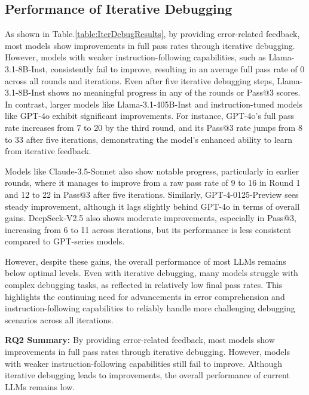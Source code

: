 \subsection{Performance of Iterative Debugging}  

As shown in Table.\ref{table:IterDebugResults}, by providing error-related feedback, most models show improvements in full pass rates through iterative debugging. However, models with weaker instruction-following capabilities, such as Llama-3.1-8B-Inst, consistently fail to improve, resulting in an average full pass rate of 0 across all rounds and iterations. Even after five iterative debugging steps, Llama-3.1-8B-Inst shows no meaningful progress in any of the rounds or Pass@3 scores. In contrast, larger models like Llama-3.1-405B-Inst and instruction-tuned models like GPT-4o exhibit significant improvements. For instance, GPT-4o's full pass rate increases from 7 to 20 by the third round, and its Pass@3 rate jumps from 8 to 33 after five iterations, demonstrating the model's enhanced ability to learn from iterative feedback.

Models like Claude-3.5-Sonnet also show notable progress, particularly in earlier rounds, where it manages to improve from a raw pass rate of 9 to 16 in Round 1 and 12 to 22 in Pass@3 after five iterations. Similarly, GPT-4-0125-Preview sees steady improvement, although it lags slightly behind GPT-4o in terms of overall gains. DeepSeek-V2.5 also shows moderate improvements, especially in Pass@3, increasing from 6 to 11 across iterations, but its performance is less consistent compared to GPT-series models.

However, despite these gains, the overall performance of most LLMs remains below optimal levels. Even with iterative debugging, many models struggle with complex debugging tasks, as reflected in relatively low final pass rates. This highlights the continuing need for advancements in error comprehension and instruction-following capabilities to reliably handle more challenging debugging scenarios across all iterations.


\begin{center}
    \begin{myboxc} \textbf{RQ2 Summary: } %
    By providing error-related feedback, most models show improvements in full pass rates through iterative debugging. However, models with weaker instruction-following capabilities still fail to improve. Although iterative debugging leads to improvements, the overall performance of current LLMs remains low.
    \end{myboxc} %
\end{center}

